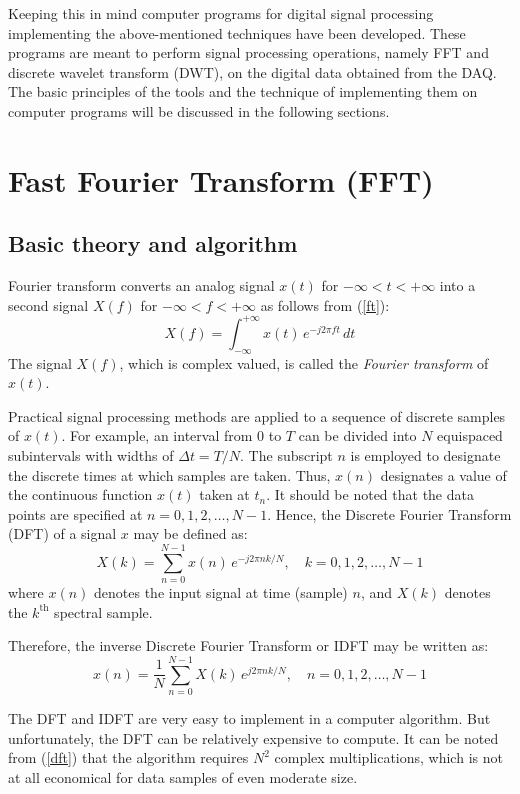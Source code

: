 \documentclass[a4paper,11pt]{report}
\begin{document}
Keeping this in mind computer programs for digital signal processing implementing the above-mentioned techniques have been developed. These programs are meant to perform signal processing operations, namely FFT and discrete wavelet transform (DWT), on the digital data obtained from the DAQ. The basic principles of the tools and the technique of implementing them on computer programs will be discussed in the following sections.

\section{Fast Fourier Transform (FFT)}
\subsection{Basic theory and algorithm} \label{fftbas}
Fourier transform converts an analog signal $x(t)$ for $-\infty < t < +\infty$ into a second signal $X(f)$ for $-\infty < f < +\infty$ as follows from (\ref{ft}):
\begin{equation}
X(f) = \int_{-\infty}^{+\infty} x(t)\,e^{-j2\pi ft}\,dt
\end{equation}
The signal $X(f)$, which is complex valued, is called the \emph{Fourier transform} of $x(t)$.

Practical signal processing methods are applied to a sequence of discrete samples of $x(t)$. For example, an interval from 0 to $T$ can be divided into $N$ equispaced subintervals with widths of $\Delta t = T/N$. The subscript $n$ is employed to designate the discrete times at which samples are taken. Thus, $x(n)$ designates a value of the continuous function $x(t)$ taken at $t_{n}$. It should be noted that the data points are specified at $n=0,1,2,\ldots,N-1$. Hence, the Discrete Fourier Transform (DFT) of a signal $x$ may be defined as:
\begin{equation} \label{dft}
X(k) = \sum^{N-1}_{n=0} x(n)\,e^{-j2\pi n k/N}, \quad k=0,1,2,\ldots,N-1
\end{equation}
where $x(n)$ denotes the input signal at time (sample) $n$, and $X(k)$ denotes the $k^{\mathrm{th}}$ spectral sample.

Therefore, the inverse Discrete Fourier Transform or IDFT may be written as:
\begin{equation}
x(n) = \frac{1}{N} \sum^{N-1}_{n=0} X(k)\,e^{j2\pi n k/N}, \quad n=0,1,2,\ldots,N-1
\end{equation}

The DFT and IDFT are very easy to implement in a computer algorithm. But unfortunately, the DFT can be relatively expensive to compute. It can be noted from (\ref{dft}) that the algorithm requires $N^{2}$ complex multiplications, which is not at all economical for data samples of even moderate size. 
\end{document}
